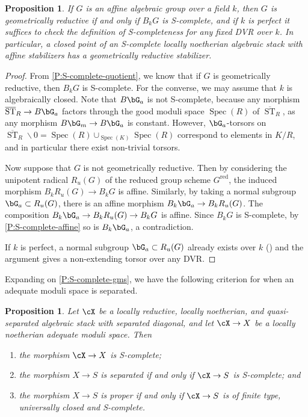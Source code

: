 \documentclass[a4paper]{amsart}
\numberwithin{equation}{section}
\theoremstyle{plain}
\newtheorem{prop}[thm]{Proposition}
\theoremstyle{definition}
\DeclareMathOperator{\Spec}{Spec}
\DeclareMathOperator{\ST}{ST}
\DeclareMathOperator{\red}{red}
\def\oST{\overline{\ST}}
\begin{document}
\begin{prop}\label{P:SCompleteReductive}  If $G$ is an {affine} algebraic group over a field $k$, then $G$ is geometrically reductive if and only if $B_k G$ is {\textsf{S}}-complete, and if $k$ is perfect it suffices to check the definition of \textsf{S}-completeness for any fixed DVR over $k$.  In particular, a closed point of an {\textsf{S}}-complete locally noetherian algebraic stack with affine stabilizers has a geometrically reductive stabilizer.
\end{prop}

\begin{proof} From \eqref{P:S-complete-quotient}, we know that if $G$ is geometrically reductive, then $B_k G$ is {\textsf{S}}-complete.  For the converse, we may assume that $k$ is algebraically closed. Note that $B\bG_a$ is not \textsf{S}-complete, because any morphism $\oST_R \to B\bG_a$ factors through the good moduli space $\Spec(R)$ of $\oST_R$, as any morphism $B\bG_m\to B\bG_a$ is constant. However, $\bG_a$-torsors on $\oST_R \smallsetminus 0 = \Spec(R)\cup_{\Spec(K)}\Spec(R)$ correspond to elements in $K/R$, and in particular there exist non-trivial torsors.

Now suppose that $G$ is not geometrically reductive.  Then by considering the unipotent radical $R_u(G)$ of the reduced group scheme $G^{\red}$, the induced morphism $B_k R_u(G) \to B_k G$ is affine.  Similarly, by taking a normal subgroup $\bG_a \subset R_u(G)$, there is an affine morphism $B_k \bG_a \to B_k R_u(G)$.  The composition $B_k \bG_a \to B_k R_u(G) \to B_k G$ is affine.  Since $B_k G$ is {\textsf{S}}-complete, by \eqref{P:S-complete-affine} so is $B_k \bG_a$, a contradiction.

If $k$ is perfect, a normal subgroup $\bG_a \subset R_u(G)$ already exists over $k$ (\cite[Corollary 14.3.10]{springer}) and the argument gives a non-extending torsor over any DVR.
\end{proof}

Expanding on \eqref{P:S-complete-gms}, we have the following criterion for when an adequate moduli space is separated.

\begin{prop} \label{P:gms-S-complete}
	Let $\cX$ be a locally reductive, {locally noetherian, and quasi-separated} algebraic stack with separated diagonal, and let $\cX \to X$ be a {locally noetherian} adequate moduli space.  Then
\begin{enumerate}
\item \label{P:gms-S-complete1}
the morphism $\cX \to X$ is {\textsf{S}}-complete;
\item \label{P:gms-S-complete2}
the morphism $X \to S$ is separated if and only if $\cX \to S$ is {\textsf{S}}-complete; and
\item \label{P:gms-S-complete3}
the  morphism $X \to S$  is proper if and only if $\cX \to S$ is of finite type, universally closed and {\textsf{S}}-complete.
\end{enumerate}
\end{prop}
\end{document}
